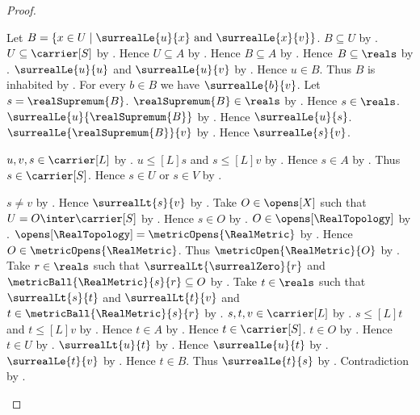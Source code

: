 \begin{proof}
\begin{subproof}
        Let $B=\{x\in U\mid
            \text{$\surrealLe{u}{x}$ and $\surrealLe{x}{v}$}\}$.
        $B\subseteq U$ by .
        $U\subseteq\carrier[S]$ by .
        Hence $U\subseteq A$ by \auto.
        Hence $B\subseteq A$ by .
        Hence $B\subseteq\reals$ by .
        $\surrealLe{u}{u}$ and $\surrealLe{u}{v}$ by
            .
        Hence $u\in B$.
        Thus $B$ is inhabited by \auto.
        For every $b\in B$ we have $\surrealLe{b}{v}$.
        Let $s=\realSupremum{B}$.
        $\realSupremum{B}\in\reals$ by
            .
        Hence $s\in\reals$.
        $\surrealLe{u}{\realSupremum{B}}$ by
            .
        Hence $\surrealLe{u}{s}$.
        $\surrealLe{\realSupremum{B}}{v}$ by
            .
        Hence $\surrealLe{s}{v}$.

        $u,v,s\in\carrier[L]$ by \auto.
        $u\mathrel{\leq[L]}s$ and $s\mathrel{\leq[L]}v$ by
            .
        Hence $s\in A$ by .
        Thus $s\in\carrier[S]$.
        Hence $s\in U$ or $s\in V$ by .

        \begin{byCase}
            $s\neq v$ by .
            Hence $\surrealLt{s}{v}$ by .
            Take $O\in\opens[X]$ such that
                $U=O\inter\carrier[S]$ by
                .
            Hence $s\in O$ by .
            $O\in\opens[\RealTopology]$ by \auto.
            $\opens[\RealTopology]=\metricOpens{\RealMetric}$ by
                .
            Hence $O\in\metricOpens{\RealMetric}$.
            Thus $\metricOpen{\RealMetric}{O}$ by
                .
            Take $r\in\reals$ such that
                $\surrealLt{\surrealZero}{r}$ and
                $\metricBall{\RealMetric}{s}{r}\subseteq O$ by
                .
            Take $t\in\reals$ such that
                $\surrealLt{s}{t}$ and $\surrealLt{t}{v}$ and
                $t\in\metricBall{\RealMetric}{s}{r}$ by
                .
            $s,t,v\in\carrier[L]$ by \auto.
            $s\mathrel{\leq[L]}t$ and $t\mathrel{\leq[L]}v$ by
                .
            Hence $t\in A$ by .
            Hence $t\in\carrier[S]$.
            $t\in O$ by .
            Hence $t\in U$ by .
            $\surrealLt{u}{t}$ by
                .
            Hence $\surrealLe{u}{t}$ by .
            $\surrealLe{t}{v}$ by .
            Hence $t\in B$.
            Thus $\surrealLe{t}{s}$ by
                .
            Contradiction by
                .


\end{byCase}
\end{subproof}
\end{proof}
